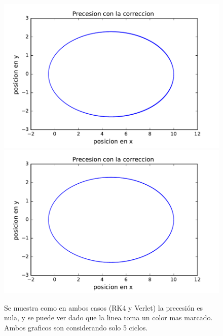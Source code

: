 \documentclass[10pt]{article}
\begin{document}
\begin{figure}[H]
\centering
\includegraphics[scale=0.5]{pres_rk4_5.pdf}
\includegraphics[scale=0.5]{pres_verlet_5.pdf}
\caption{Se muestra como en ambos casos (RK4 y Verlet) la precesión es nula, y se puede ver dado que la linea toma un color mas marcado. Ambos graficos son considerando solo 5 ciclos.}
\label{img_prec_5}
\end{figure}
\end{document}
